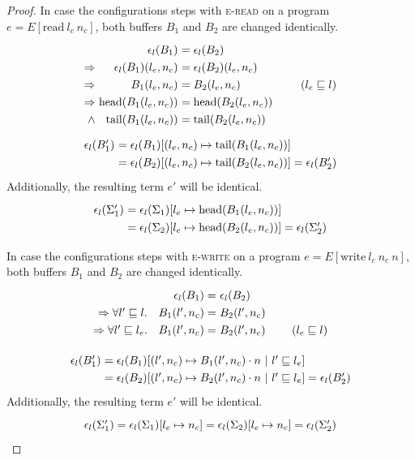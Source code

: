 \documentclass[10pt,preprint]{sigplanconf}
\newcommand{\arrayStretch}{1.28}
\begin{document}
\begin{proof}
In case the configurations steps with \textsc{e-read} on a program $e=E[\text{read}~l_c~n_c]$, both buffers $B_1$ and $B_2$ are changed identically.
\[\arraycolsep=1.6pt\def\arraystretch{\arrayStretch}
\begin{array}{rrl}
  & \epsilon_l(B_1) &= \epsilon_l(B_2) \\
  \Rightarrow & \epsilon_l(B_1)(l_e,n_c) &= \epsilon_l(B_2)(l_e,n_c) \\
  \Rightarrow &  B_1(l_e,n_c) &= B_2(l_e,n_c)~~~~~~~~~~~~~~~~(l_e \sqsubseteq l) \\
  \Rightarrow & \text{head}(B_1(l_e,n_c)) &= \text{head} (B_2(l_e,n_c)) \\
  \wedge & \text{tail}(B_1(l_e,n_c)) &= \text{tail} (B_2(l_e,n_c))
\end{array} \]
\[\arraycolsep=1.6pt\def\arraystretch{\arrayStretch}
\begin{array}{rl}
  \epsilon_l(B'_1) & = \epsilon_l(B_1)[(l_e,n_c) \mapsto \text{tail} (B_1(l_e,n_c))] \\
                   & = \epsilon_l(B_2)[(l_e,n_c) \mapsto \text{tail} (B_2(l_e,n_c))] = \epsilon_l(B'_2) \\
\end{array} \]
  Additionally, the resulting term $e'$ will be identical.
\[\arraycolsep=1.6pt\def\arraystretch{\arrayStretch}
\begin{array}{rl}
  \epsilon_l(\Sigma'_1) & = \epsilon_l(\Sigma_1)[l_e \mapsto \text{head}(B_1(l_e,n_c))]  \\
                        & = \epsilon_l(\Sigma_2)[l_e \mapsto \text{head}(B_2(l_e,n_c))] = \epsilon_l(\Sigma'_2)
\end{array} \]

In case the configurations steps with \textsc{e-write} on a program $e=E[\text{write}~l_c~n_c~n]$, both buffers $B_1$ and $B_2$ are changed identically.
\[\arraycolsep=1.6pt\def\arraystretch{\arrayStretch}
\begin{array}{rrlr}
  &~~\epsilon_l(B_1) =& \epsilon_l(B_2) \\
  \Rightarrow \forall l' \sqsubseteq l.&~~B_1(l',n_c) =& B_2(l',n_c) \\
  \Rightarrow \forall l' \sqsubseteq l_e.&~~B_1(l',n_c) =& B_2(l',n_c) & ~~~~~~(l_e \sqsubseteq l)
\end{array} \]

\[\arraycolsep=1.6pt\def\arraystretch{\arrayStretch}
\begin{array}{rl}
  \epsilon_l(B'_1) & = \epsilon_l(B_1)[(l',n_c) \mapsto B_1(l',n_c) \cdot n~|~ l' \sqsubseteq l_e ] \\
                   & = \epsilon_l(B_2)[(l',n_c) \mapsto B_2(l',n_c) \cdot n~|~ l' \sqsubseteq l_e ] = \epsilon_l(B'_2) \\
\end{array} \]
  Additionally, the resulting term $e'$ will be identical.
\[\arraycolsep=1.6pt\def\arraystretch{\arrayStretch}
\begin{array}{c}
  \epsilon_l(\Sigma'_1) = \epsilon_l(\Sigma_1)[l_e \mapsto n_c] = \epsilon_l(\Sigma_2)[l_e \mapsto n_c] = \epsilon_l(\Sigma'_2)
\end{array} \]


\end{proof}
\end{document}
